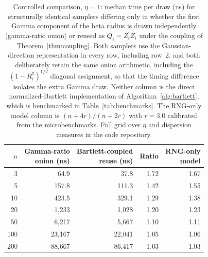 \documentclass[12pt,english]{article}
\theoremstyle{plain} %
\theoremstyle{definition} %
\theoremstyle{remark} %
\begin{document}
\begin{table}[t]
\centering
\caption{Controlled comparison, $\eta=1$: median time per draw (ns) for structurally identical samplers differing only in whether the first Gamma component of the beta radius is drawn independently (gamma-ratio onion) or reused as $Q_i=Z_i^\prime Z_i$ under the coupling of Theorem~\ref{thm:coupling}. Both samplers use the Gaussian-direction representation in every row, including row~2, and both deliberately retain the same onion arithmetic, including the $(1-R_i^2)^{1/2}$ diagonal assignment, so that the timing difference isolates the extra Gamma draw. Neither column is the direct normalized-Bartlett implementation of Algorithm~\ref{alg:bartlett}, which is benchmarked in Table~\ref{tab:benchmarks}. The RNG-only model column is $(n+4r)/(n+2r)$ with $r=3.0$ calibrated from the microbenchmarks. Full grid over $\eta$ and dispersion measures in the code repository.}
\label{tab:controlled}
\begin{tabular}{rrrrr}
\toprule
$n$ & \makecell{Gamma-ratio\\onion (ns)} & \makecell{Bartlett-coupled\\reuse (ns)} & Ratio & \makecell{RNG-only\\model} \\
\midrule
  3 &     64.9 &     37.8 & 1.72 & 1.67 \\
  5 &    157.8 &    111.3 & 1.42 & 1.55 \\
 10 &    423.5 &    329.1 & 1.29 & 1.38 \\
 20 &  1{,}233 &  1{,}028 & 1.20 & 1.23 \\
 50 &  6{,}217 &  5{,}667 & 1.10 & 1.11 \\
100 & 23{,}167 & 22{,}041 & 1.05 & 1.06 \\
200 & 88{,}667 & 86{,}417 & 1.03 & 1.03 \\
\bottomrule
\end{tabular}
\end{table}
\end{document}
